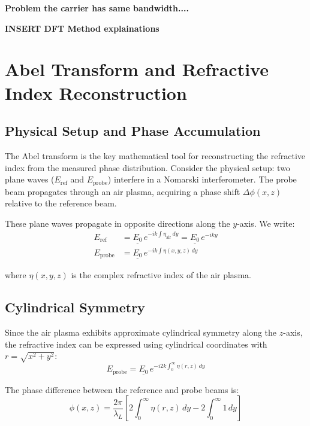 \documentclass[11pt,a4paper]{article}
\begin{document}
\textbf{Problem the carrier has same bandwidth....}

\textbf{INSERT DFT Method explainations}


\section{Abel Transform and Refractive Index Reconstruction}

\subsection{Physical Setup and Phase Accumulation}

The Abel transform is the key mathematical tool for reconstructing the refractive index from the measured phase distribution. Consider the physical setup: two plane waves ($E_{\text{ref}}$ and $E_{\text{probe}}$) interfere in a Nomarski interferometer. The probe beam propagates through an air plasma, acquiring a phase shift $\Delta\phi(x,z)$ relative to the reference beam.

These plane waves propagate in opposite directions along the $y$-axis. We write:
\begin{align}
E_{\text{ref}} &= \underline{E_0} \, e^{-ik\int \eta_{\text{air}} \, dy} = \underline{E_0} \, e^{-iky} \\
E_{\text{probe}} &= \underline{E_0} \, e^{-ik \int \eta(x,y,z) \, dy}
\end{align}

where $\eta(x,y,z)$ is the complex refractive index of the air plasma.

\subsection{Cylindrical Symmetry}

Since the air plasma exhibits approximate cylindrical symmetry along the $z$-axis, the refractive index can be expressed using cylindrical coordinates with $r = \sqrt{x^2 + y^2}$:
\begin{equation}
E_{\text{probe}} = \underline{E_0} \, e^{-i2k\int_0^{\infty} \eta(r,z) \, dy}
\end{equation}

The phase difference between the reference and probe beams is:
\begin{equation}
\phi(x,z) = \frac{2\pi}{\lambda_L}\left[2\int_0^{\infty}\eta(r,z) \, dy - 2\int_0^{\infty}1 \, dy\right]
\end{equation}
\end{document}
